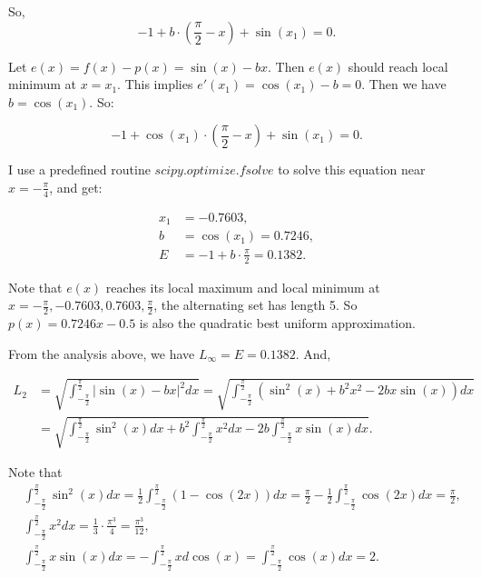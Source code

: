 \documentclass[
  course = {{16-811 Math Fundamentals for Robotics}},
  quartile = {{1}},
  assignment = 3,
  name = {{Kangle Deng}},
  email = {{kangled@andrew.cmu.edu}},
  firstexercise = 1
]{aga-homework}
\begin{document}
So,
\begin{equation*}
    -1 + b \cdot (\frac{\pi}{2} - x) + \sin(x_1) = 0.
\end{equation*}

Let $e(x) = f(x) - p(x) = \sin(x) - bx$. Then $e(x)$ should reach local minimum at $x = x_1$. This implies $e'(x_1) = \cos(x_1) - b = 0$. Then we have $b = \cos(x_1)$. So:

\begin{equation*}
    -1 + \cos(x_1) \cdot (\frac{\pi}{2} - x) + \sin(x_1) = 0.
\end{equation*}

I use a predefined routine $scipy.optimize.fsolve$ to solve this equation near $x = -\frac{\pi}{4}$, and get:

\begin{equation*}
    \begin{aligned}
     x_1 & = -0.7603, \\
     b & = \cos(x_1) = 0.7246, \\
     E & = -1 + b \cdot \frac{\pi}{2} = 0.1382.
    \end{aligned}
\end{equation*}

Note that $e(x)$ reaches its local maximum and local minimum at $x = -\frac{\pi}{2}, -0.7603, 0.7603, \frac{\pi}{2}$, the alternating set has length 5. So $p(x) = 0.7246x-0.5$ is also the quadratic best uniform approximation.

From the analysis above, we have $L_{\infty} = E = 0.1382$. And, 

\begin{equation*}
\begin{aligned}
    L_2 & = \sqrt{\int_{-\frac{\pi}{2}}^{\frac{\pi}{2}}|\sin(x)-bx|^2dx} = \sqrt{\int_{-\frac{\pi}{2}}^{\frac{\pi}{2}}(\sin^2(x) + b^2x^2 - 2bx\sin(x))dx} \\
    & = \sqrt{\int_{-\frac{\pi}{2}}^{\frac{\pi}{2}}\sin^2(x)dx + b^2\int_{-\frac{\pi}{2}}^{\frac{\pi}{2}}x^2 dx - 2b\int_{-\frac{\pi}{2}}^{\frac{\pi}{2}} x\sin(x)dx}.
\end{aligned}
\end{equation*}

Note that
\begin{equation*}
    \begin{aligned}
        & \int_{-\frac{\pi}{2}}^{\frac{\pi}{2}}\sin^2(x)dx = \frac{1}{2}\int_{-\frac{\pi}{2}}^{\frac{\pi}{2}} (1 - \cos(2x))dx = \frac{\pi}{2} - \frac{1}{2}\int_{-\frac{\pi}{2}}^{\frac{\pi}{2}} \cos(2x) dx = \frac{\pi}{2},\\
        & \int_{-\frac{\pi}{2}}^{\frac{\pi}{2}}x^2 dx = \frac{1}{3} \cdot \frac{\pi^3}{4} = \frac{\pi^3}{12},\\
        & \int_{-\frac{\pi}{2}}^{\frac{\pi}{2}} x\sin(x)dx  = -\int_{-\frac{\pi}{2}}^{\frac{\pi}{2}} x d\cos(x) = \int_{-\frac{\pi}{2}}^{\frac{\pi}{2}} \cos(x)dx = 2.
    \end{aligned}
\end{equation*}
\end{document}
